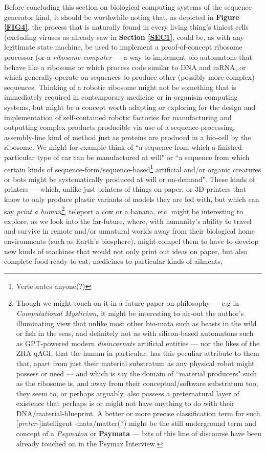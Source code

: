\documentclass[a4paper, 18pt]{article} %
\begin{document}
Before concluding this section on biological computing systems of the sequence generator kind\cite{lutalo2025transformatic}, it should be worthwhile noting that, as depicted in \textbf{Figure \ref{FIG4}}, the process that is naturally found in every living thing's tiniest cells (excluding viruses as already saw in \textbf{Section \ref{SEC1}}, could be, as with any legitimate state machine, be used to implement a proof-of-concept ribosome processor (or a \textit{ribosome computer} --- a way to implement bio-automatons that behave like a ribosome or which process code similar to DNA and mRNA, or which generally operate on sequences to produce other (possibly more complex) sequences. Thinking of a robotic ribosome might not be something that is immediately required in contemporary medicine or in-organism computing systems, but might be a concept worth adapting or exploring for the design and implementation of self-contained robotic factories for manufacturing and outputting complex products producible via use of a sequence-processing, assembly-line kind of method just as proteins are produced in a bio-cell by the ribosome. We might for example think of ``a sequence from which a finished particular type of car can be manufactured at will" or ``a sequence from which certain kinds of sequence-form/sequence-based\footnote{Vertebrates anyone(?)} artificial and/or organic creatures or bots might be systematically produced at will or on-demand". These kinds of printers --- which, unlike just printers of things on paper, or 3D-printers that know to only produce plastic variants of models they are fed with, but which can say \textit{print a human}\footnote{Though we might touch on it in a future paper on philosophy --- e.g in \textit{Computational Mysticism}\cite{lutalo2024mysticism}, it might be interesting to air-out the author's illuminating view that unlike most other bio-mata such as beasts in the wild or fish in the seas, and definitely not as with silicon-based automatons such as GPT-powered modern \textit{disincarnate} artificial entities --- nor the likes of the ZHA qAGI\cite{jwlzha}, that the human in particular, has this peculiar attribute to them that, apart from just their material substratum as any physical robot might possess or need --- and which is say the domain of ``material producers" such as the ribosome is, and away from their conceptual/software substratum too, they seem to, or perhaps arguably, also possess a preternatural layer of existence that perhaps is or might not have anything to do with their DNA/material-blueprint. A better or more precise classification term for such [\textit{preter-}]intelligent -mata/matter(?) might be the still underground term and concept of a \textit{Psymaton} or \textbf{Psymata} --- bits of this line of discourse have been already touched on in the Psymaz Interview\cite{lutalo2025unraveling}.}, teleport a cow or a banana, etc. might be interesting to explore, as we look into the far-future, where, with humanity's ability to travel and survive in remote and/or unnatural worlds away from their biological home environments (such as Earth's biosphere), might compel them to have to develop new kinds of machines that would not only print out ideas on paper, but also complete food ready-to-eat, medicines to particular kinds of ailments, 
\end{document}

